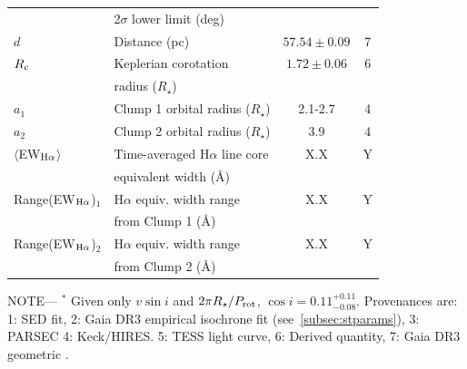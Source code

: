 \documentclass{nature3}
\begin{document}
\begin{table}
\begin{tabular}{llcc}
                                        & \hspace{3pt}  2$\sigma$ lower limit (deg)	                     &                      \\
%
$d$\dotfill                             & Distance (pc)\dotfill                                          & $57.54 \pm 0.09$   & 7 \\
%
$R_{\rm c}$\dotfill		                  & Keplerian corotation\dotfill                                   & $1.72 \pm 0.06$  & 6 \\
                                        & \hspace{3pt} radius ($R_\star$)	                               &                      \\
%
$a_1$\dotfill                           & Clump 1 orbital radius ($R_\star$)\hspace{9pt}\dotfill         &  2.1-2.7         & 4 \\
$a_2$\dotfill                           & Clump 2 orbital radius ($R_\star$)\hspace{9pt}\dotfill         &  3.9             & 4 \\
%
$\langle$EW$_{\rm H\alpha}$$\rangle$    & Time-averaged H$\alpha$ line core                              &  X.X             & Y \\ 
                                        & \hspace{3pt} equivalent width (\AA)	                           &                      \\
Range(EW$_{\rm H\alpha}$)$_1$           & H$\alpha$ equiv. width range                                   &  X.X             & Y \\ 
                                        & \hspace{3pt} from Clump 1 (\AA)	                               &                      \\
Range(EW$_{\rm H\alpha}$)$_2$           & H$\alpha$ equiv. width range                                   &  X.X             & Y \\ 
                                        & \hspace{3pt} from Clump 2 (\AA)	                               &                      \\
\hline
\end{tabular}
\begin{flushleft}
\footnotesize{ \textsc{NOTE}---
$^*$ Given only $v\sin i$ and $2\pi R_\star/P_{\rm rot}$, $\cos i=0.11^{+0.11}_{-0.08}$.
Provenances are:
1: SED fit\cite{Bouma2024},
2: Gaia DR3 empirical isochrone fit (see~\ref{subsec:stparams}),
3: PARSEC %
4: Keck/HIRES.
5: TESS light curve,
6: Derived quantity,
7: Gaia DR3 geometric \cite{GaiaDR3}.
}
\end{flushleft}
\vspace{-0.5cm}
\end{table}
\end{document}
